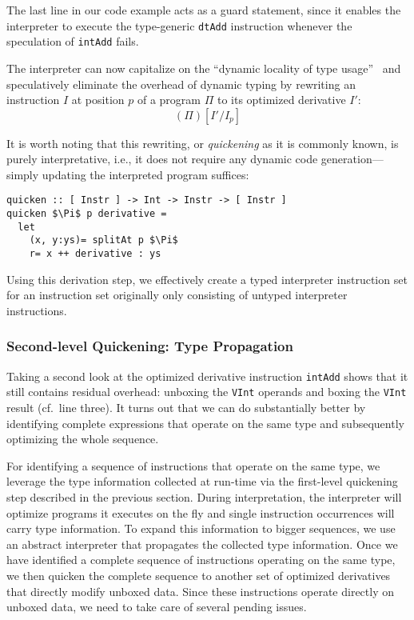 \documentclass[preprint,10pt]{popl14conf}
\begin{document}
The last line in our code example acts as a guard statement, since it enables the interpreter to
execute the type-generic \texttt{dtAdd} instruction whenever the speculation of \texttt{intAdd} fails.

The interpreter can now capitalize on the ``dynamic locality of type
usage''~\cite{deutsch.schiffman+84} and speculatively eliminate the overhead of dynamic typing by
rewriting an instruction $I$ at position $p$ of a program $\Pi$ to its optimized derivative $I'$:
\begin{equation}
  \label{eq:quickening}
  (\Pi)[I'/ I_{p}]
\end{equation}

It is worth noting that this rewriting, or \emph{quickening} as it is commonly known, is purely
interpretative, i.e., it does not require any dynamic code generation---simply updating the
interpreted program suffices:

\begin{lstlisting}[style=prettyhaskell]
quicken :: [ Instr ] -> Int -> Instr -> [ Instr ]
quicken $\Pi$ p derivative =
  let
    (x, y:ys)= splitAt p $\Pi$
    r= x ++ derivative : ys
\end{lstlisting}

Using this derivation step, we effectively create a typed interpreter instruction set for an
instruction set originally only consisting of untyped interpreter instructions.


\subsubsection{Second-level Quickening: Type Propagation}

Taking a second look at the optimized derivative instruction \texttt{intAdd} shows that it still
contains residual overhead: unboxing the \texttt{VInt} operands and boxing the \texttt{VInt} result
(cf.~line three).
It turns out that we can do substantially better by identifying complete expressions that operate on
the same type and subsequently optimizing the whole sequence.

For identifying a sequence of instructions that operate on the same type, we leverage the type
information collected at run-time via the first-level quickening step described in the previous
section.
During interpretation, the interpreter will optimize programs it executes on the fly and single
instruction occurrences will carry type information.
To expand this information to bigger sequences, we use an abstract interpreter that propagates
the collected type information.
Once we have identified a complete sequence of instructions operating on the same type, we then
quicken the complete sequence to another set of optimized derivatives that directly modify unboxed
data.
Since these instructions operate directly on unboxed data, we need to take care of several pending
issues.
\end{document}
